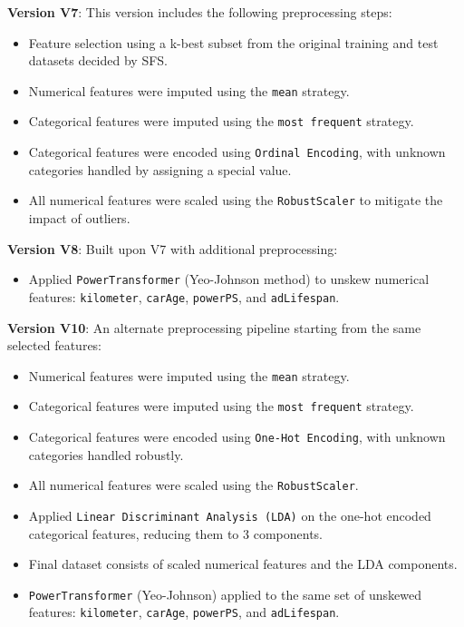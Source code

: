 \documentclass[conference]{IEEEtran}
\begin{document}
\textbf{Version V7}: This version includes the following
        preprocessing steps:
        \begin{itemize}
                \item Feature selection using a k-best subset from the original
                        training and test datasets decided by SFS.
                \item Numerical features were imputed using the \texttt{mean}
                        strategy.
                \item Categorical features were imputed using the \texttt{most
                        frequent} strategy.
                \item Categorical features were encoded using \texttt{Ordinal
                        Encoding}, with unknown categories handled by assigning
                        a special value.
                \item All numerical features were scaled using the
                        \texttt{RobustScaler} to mitigate the impact of
                        outliers.
        \end{itemize}

\textbf{Version V8}: Built upon V7 with additional preprocessing:
        \begin{itemize}
                \item Applied \texttt{PowerTransformer} (Yeo-Johnson method) to
                        unskew numerical features: \texttt{kilometer},
                        \texttt{carAge}, \texttt{powerPS}, and
                        \texttt{adLifespan}.
        \end{itemize}

\textbf{Version V10}: An alternate preprocessing pipeline starting
        from the same selected features:
        \begin{itemize}
                \item Numerical features were imputed using the \texttt{mean}
                        strategy.
                \item Categorical features were imputed using the \texttt{most
                        frequent} strategy.
                \item Categorical features were encoded using \texttt{One-Hot
                        Encoding}, with unknown categories handled robustly.
                \item All numerical features were scaled using the
                        \texttt{RobustScaler}.
                \item Applied \texttt{Linear Discriminant Analysis (LDA)} on
                        the one-hot encoded categorical features, reducing them
                        to 3 components.
                \item Final dataset consists of scaled numerical features and
                        the LDA components.
                \item \texttt{PowerTransformer} (Yeo-Johnson) applied to the
                        same set of unskewed features: \texttt{kilometer},
                        \texttt{carAge}, \texttt{powerPS}, and
                        \texttt{adLifespan}.
        \end{itemize}
\end{document}
